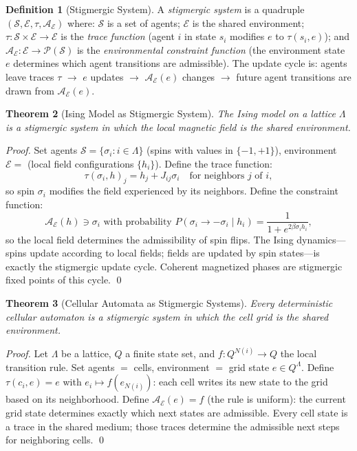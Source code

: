 \documentclass[12pt, a4paper, twoside]{article}
\theoremstyle{plain}
\newtheorem{theorem}{Theorem}[section]
\theoremstyle{definition}
\newtheorem{definition}[theorem]{Definition}
\theoremstyle{remark}
\newcommand{\Acc}{\mathcal{A}}
\begin{document}
\begin{definition}[Stigmergic System]
A \emph{stigmergic system} is a quadruple $(\mathcal{S}, \mathcal{E}, \tau, \Acc_\mathcal{E})$
where: $\mathcal{S}$ is a set of agents; $\mathcal{E}$ is the shared environment;
$\tau: \mathcal{S} \times \mathcal{E} \to \mathcal{E}$ is the \emph{trace
function} (agent $i$ in state $s_i$ modifies $e$ to $\tau(s_i, e)$); and
$\Acc_\mathcal{E}: \mathcal{E} \to \mathcal{P}(\mathcal{S})$ is the
\emph{environmental constraint function} (the environment state $e$ determines
which agent transitions are admissible). The update cycle is:
agents leave traces $\tau$ $\to$ $e$ updates $\to$ $\Acc_\mathcal{E}(e)$
changes $\to$ future agent transitions are drawn from $\Acc_\mathcal{E}(e)$.
\end{definition}

\begin{theorem}[Ising Model as Stigmergic System]
\label{thm:ising_stigmergy}
The Ising model on a lattice $\Lambda$ is a stigmergic system in which the
local magnetic field is the shared environment.
\end{theorem}

\begin{proof}
Set agents $\mathcal{S} = \{\sigma_i : i \in \Lambda\}$ (spins with values in
$\{-1, +1\}$), environment $\mathcal{E} = $ (local field configurations
$\{h_i\}$). Define the trace function:
\[
  \tau(\sigma_i, h)_j = h_j + J_{ij}\sigma_i \quad \text{for neighbors } j \text{ of } i,
\]
so spin $\sigma_i$ modifies the field experienced by its neighbors. Define the
constraint function:
\[
  \Acc_\mathcal{E}(h) \ni \sigma_i \text{ with probability }
  P(\sigma_i \to -\sigma_i \mid h_i) = \frac{1}{1 + e^{2\beta\sigma_i h_i}},
\]
so the local field determines the admissibility of spin flips. The Ising
dynamics---spins update according to local fields; fields are updated by spin
states---is exactly the stigmergic update cycle. Coherent magnetized phases are
stigmergic fixed points of this cycle.
\qed
\end{proof}

\begin{theorem}[Cellular Automata as Stigmergic Systems]
\label{thm:ca_stigmergy}
Every deterministic cellular automaton is a stigmergic system in which the
cell grid is the shared environment.
\end{theorem}

\begin{proof}
Let $\Lambda$ be a lattice, $Q$ a finite state set, and $f: Q^{N(i)} \to Q$
the local transition rule. Set agents $=$ cells, environment $=$ grid state
$e \in Q^\Lambda$. Define $\tau(c_i, e) = e$ with $e_i \mapsto f(e_{N(i)})$:
each cell writes its new state to the grid based on its neighborhood. Define
$\Acc_\mathcal{E}(e) = f$ (the rule is uniform): the current grid state
determines exactly which next states are admissible. Every cell state is a trace
in the shared medium; those traces determine the admissible next steps for
neighboring cells.
\qed
\end{proof}
\end{document}
